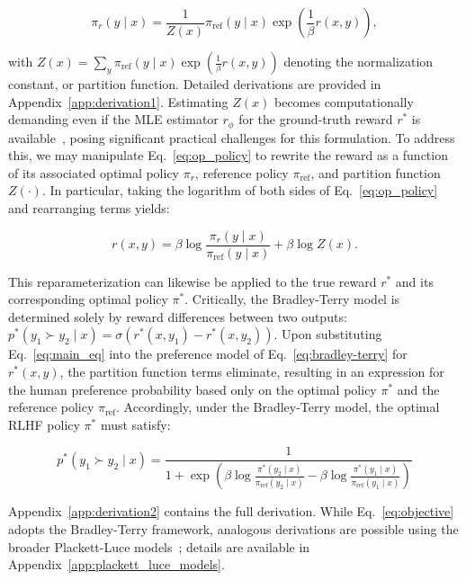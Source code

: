\begin{equation}\label{eq:op_policy}
    \pi_r(y\mid x) = \frac{1}{Z(x)}\pi_\text{ref}(y\mid x)\exp\left(\frac{1}{\beta}r(x, y)\right),
\end{equation}

with $Z(x) =\sum_{y}\pi_\text{ref}(y\mid x)\exp\left(\frac{1}{\beta}r(x, y)\right)$ denoting the normalization constant, or partition function. Detailed derivations are provided in Appendix~\ref{app:derivation1}. Estimating $Z(x)$ becomes computationally demanding even if the MLE estimator $r_{\phi}$ for the ground-truth reward $r^*$ is available~\citep{korbak2022reinforcement, go2023aligning}, posing significant practical challenges for this formulation. To address this, we may manipulate Eq.~\ref{eq:op_policy} to rewrite the reward as a function of its associated optimal policy $\pi_r$, reference policy $\pi_\text{ref}$, and partition function $Z(\cdot)$. In particular, taking the logarithm of both sides of Eq.~\ref{eq:op_policy} and rearranging terms yields:

\begin{equation}\label{eq:main_eq}
    r(x,y) =\beta \log \frac{\pi_r(y\mid x)}{\pi_\text{ref}(y\mid x)} + \beta \log Z(x).
\end{equation}

This reparameterization can likewise be applied to the true reward $r^*$ and its corresponding optimal policy $\pi^*$. Critically, the Bradley-Terry model is determined solely by reward differences between two outputs: ${p^*(y_1 \succ y_2 \mid x) = \sigma(r^*(x, y_1) - r^*(x, y_2))}$. Upon substituting Eq.~\ref{eq:main_eq} into the preference model of Eq.~\ref{eq:bradley-terry} for $r^*(x,y)$, the partition function terms eliminate, resulting in an expression for the human preference probability based only on the optimal policy $\pi^*$ and the reference policy $\pi_\text{ref}$. Accordingly, under the Bradley-Terry model, the optimal RLHF policy $\pi^*$ must satisfy:

\begin{equation}\label{eq:objective}
    p^*(y_1\succ y_2 \mid x)=\frac{1}{1 + \exp\left(\beta \log \frac{\pi^*(y_2\mid x)}{\pi_\text{ref}(y_2\mid x)} - \beta \log \frac{\pi^*(y_1\mid x)}{\pi_\text{ref}(y_1\mid x)}\right)}
\end{equation}

Appendix~\ref{app:derivation2} contains the full derivation. While Eq.~\ref{eq:objective} adopts the Bradley-Terry framework, analogous derivations are possible using the broader Plackett-Luce models~\citep{plackett1975analysis, luce2012individual}; details are available in Appendix~\ref{app:plackett_luce_models}.

